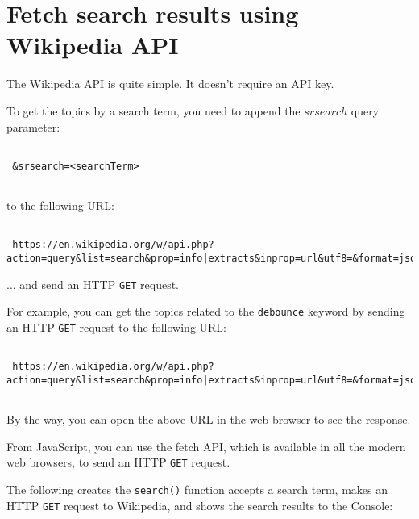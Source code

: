 \documentclass[11pt]{article}
\begin{document}
\section*{Fetch search results using Wikipedia API}

The Wikipedia API is quite simple. It doesn't require an API key.
\newline

\noindent
To get the topics by a search term, you need to append the $srsearch$
query parameter:

\begin{lstlisting}

 &srsearch=<searchTerm>
 
\end{lstlisting}

\noindent
to the following URL:

\begin{lstlisting}

 https://en.wikipedia.org/w/api.php?action=query&list=search&prop=info|extracts&inprop=url&utf8=&format=json&origin=*&srlimit=10

\end{lstlisting}

\noindent
... and send an HTTP \verb|GET| request.
\newline

\noindent
For example, you can get the topics related to the \verb|debounce| keyword by
sending an HTTP \verb|GET| request to the following URL:

\begin{lstlisting}

 https://en.wikipedia.org/w/api.php?action=query&list=search&prop=info|extracts&inprop=url&utf8=&format=json&origin=*&srlimit=10&srsearch=debounce
 
\end{lstlisting}

\noindent
By the way, you can open the above URL in the web browser to see the response.
\newline

\noindent
From JavaScript, you can use the fetch API, which is available in all
the modern web browsers, to send an HTTP \verb|GET| request.
\newline

\noindent
The following creates the \verb|search()| function accepts a search term,
makes an HTTP \verb|GET| request to Wikipedia, and shows the search results
to the Console:
\end{document}
